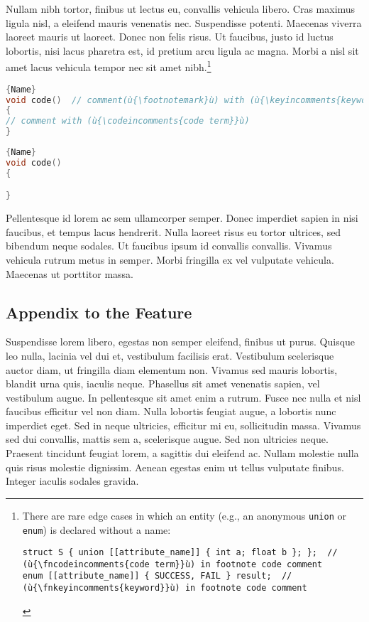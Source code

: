 Nullam nibh tortor, finibus ut lectus eu, convallis vehicula libero. Cras maximus ligula nisl, a eleifend mauris venenatis nec. Suspendisse potenti. Maecenas viverra laoreet mauris ut laoreet. Donec non felis risus. Ut faucibus, justo id luctus lobortis, nisi lacus pharetra est, id pretium arcu ligula ac magna. Morbi a nisl sit amet lacus vehicula tempor nec sit amet nibh.{\cprotect\footnote{There are rare edge cases in which an
entity (e.g., an anonymous \lstinline!union! or \lstinline!enum!) is
declared without a name:
\begin{lstlisting}[style=footcode,]
struct S { union [[attribute_name]] { int a; float b }; };  // (ù{\fncodeincomments{code term}}ù) in footnote code comment
enum [[attribute_name]] { SUCCESS, FAIL } result;  //  (ù{\fnkeyincomments{keyword}}ù) in footnote code comment
\end{lstlisting} \vspace*{-1ex}
      }}


\noindent\begin{minipage}{.45\textwidth}
\begin{lstlisting}[language=C++, caption=code 1 with a long and wrapping title,frame=tb]{Name}
void code()  // comment(ù{\footnotemark}ù) with (ù{\keyincomments{keyword}}ù)
{
// comment with (ù{\codeincomments{code term}}ù)
}
\end{lstlisting}
\end{minipage}\hfill
\begin{minipage}{.45\textwidth}
\begin{lstlisting}[language=C++, caption=code 2 with a long and wrapping title,frame=tb]{Name}
void code()
{

}
\end{lstlisting}
\end{minipage}

Pellentesque id lorem ac sem ullamcorper semper. Donec imperdiet sapien in nisi faucibus, et tempus lacus hendrerit. Nulla laoreet risus eu tortor ultrices, sed bibendum neque sodales. Ut faucibus ipsum id convallis convallis. Vivamus vehicula rutrum metus in semper. Morbi fringilla ex vel vulputate vehicula. Maecenas ut porttitor massa.

\subsection[Appendix to the Feature]{Appendix to the Feature}
Suspendisse lorem libero, egestas non semper eleifend, finibus ut purus. Quisque leo nulla, lacinia vel dui et, vestibulum facilisis erat. Vestibulum scelerisque auctor diam, ut fringilla diam elementum non. Vivamus sed mauris lobortis, blandit urna quis, iaculis neque. Phasellus sit amet venenatis sapien, vel vestibulum augue. In pellentesque sit amet enim a rutrum. Fusce nec nulla et nisl faucibus efficitur vel non diam. Nulla lobortis feugiat augue, a lobortis nunc imperdiet eget. Sed in neque ultricies, efficitur mi eu, sollicitudin massa. Vivamus sed dui convallis, mattis sem a, scelerisque augue. Sed non ultricies neque. Praesent tincidunt feugiat lorem, a sagittis dui eleifend ac. Nullam molestie nulla quis risus molestie dignissim. Aenean egestas enim ut tellus vulputate finibus. Integer iaculis sodales gravida.

